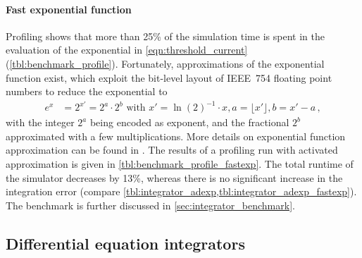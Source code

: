 \paragraph{Fast exponential function}
Profiling shows that more than 25\% of the simulation time is spent in the evaluation of the exponential in \cref{eqn:threshold_current} (\cref{tbl:benchmark_profile}). Fortunately, approximations of the exponential function exist, which exploit the bit-level layout of IEEE~754 floating point numbers to reduce the exponential to
\begin{align}
	e^x &= 2^{x'} = 2^a \cdot 2^b \text{ with } x' = \ln(2)^{-1} \cdot x, a = \lfloor x' \rfloor, b = x' - a\,,
\end{align}
with the integer $2^a$ being encoded as exponent, and the fractional $2^b$ approximated with a few multiplications. More details on exponential function approximation can be found in \cite{schraudolph1999fast}. The results of a profiling run with activated approximation is given in \cref{tbl:benchmark_profile_fastexp}. The total runtime of the simulator decreases by 13\%, whereas there is no significant increase in the integration error (compare \cref{tbl:integrator_adexp,tbl:integrator_adexp_fastexp}). The benchmark is further discussed in \cref{sec:integrator_benchmark}.


\subsection{Differential equation integrators}
\label{sec:dgl_integrator}

